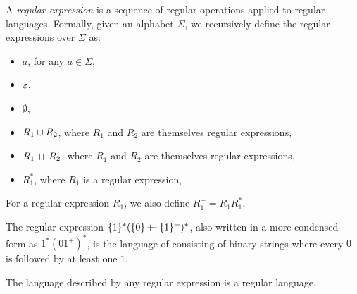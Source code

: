 \begin{defn}
    A \emph{regular expression} is a sequence of regular operations applied to regular languages. Formally, given an alphabet $\Sigma$, we recursively define the regular expressions over $\Sigma$ as:
    \begin{itemize}
        \item $a$, for any $a \in \Sigma$,
        \item $\varepsilon$,
        \item $\emptyset$,
        \item $R_1 \cup R_2$, where $R_1$ and $R_2$ are themselves regular expressions,
        \item $R_1 \kern-0.2ex+\kern-1.5ex+\kern0.4ex R_2$, where $R_1$ and $R_2$ are themselves regular expressions,
        \item $R_1^{*}$, where $R_1$ is a regular expression,
    \end{itemize}
\end{defn}

\begin{defn}
    For a regular expression $R_1$, we also define $R_1^{+} = R_1R_1^{*}$.
\end{defn}

\begin{exmp}
    The regular expression $\{1\}^{*}(\{0\} \kern-0.2ex+\kern-1.5ex+\kern0.4ex \{1\}^{+})^{*}$, also written in a more condensed form as $1^{*}(01^{+})^{*}$, is the language of consisting of binary strings where every $0$ is followed by at least one $1$.
\end{exmp}

\begin{lemma}\label{regex-to-regular-language}
    The language described by any regular expression is a regular language.
\end{lemma}


